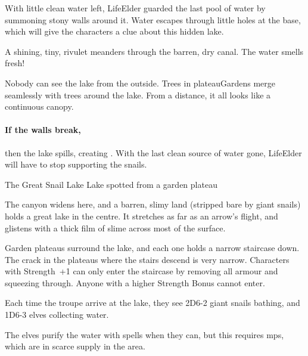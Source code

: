
With little clean water left, \gls{LifeElder} guarded the last pool of water by summoning stony walls around it.
Water escapes through little holes at the base, which will give the characters a clue about this hidden lake.

\begin{boxtext}
  A shining, tiny, rivulet meanders through the barren, dry canal.
  The water smells fresh!
\end{boxtext}

Nobody can see the lake from the outside.
Trees in \gls{plateauGardens} merge seamlessly with trees around the lake.
From a distance, it all looks like a continuous canopy.

\paragraph{If the walls break,}
then the lake spills, creating .
With the last clean source of water gone, \gls{LifeElder} will have to stop supporting the snails.

{The Great Snail Lake}%
{Lake spotted from a garden plateau}%

The canyon widens here, and a barren, slimy land (stripped bare by giant snails) holds a great lake in the centre.
It stretches as far as an arrow's flight, and glistens with a thick film of slime across most of the surface.

Garden plateaus surround the lake, and each one holds a narrow staircase down.
The crack in the plateaus where the stairs descend is very narrow.
Characters with Strength~+1 can only enter the staircase by removing all armour and squeezing through.
Anyone with a higher Strength Bonus cannot enter.

Each time the troupe arrive at the lake,
they see 2D6-2 giant snails bathing, and 1D6-3 elves collecting water.

The elves purify the water with spells when they can, but this requires \glspl{mp}, which are in scarce supply in the area.

